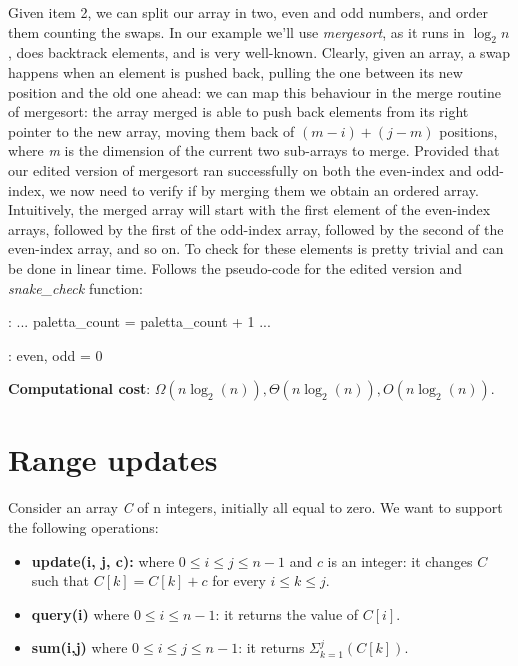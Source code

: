 \documentclass{article}
\begin{document}
Given item 2, we can split our array in two, even and odd numbers, and order
them counting the swaps.
In our example we'll use \emph{mergesort}, as it runs in $\log_2 n$, does
backtrack elements, and is very well-known.
Clearly, given an array, a swap happens when an element is pushed back, pulling
the one between its new position and the old one ahead: we can map this behaviour
in the merge routine of mergesort: the array merged is able to push back elements
from its right pointer to the new array, moving them back of $(m - i) + (j - m)$ positions,
where \emph{m} is the dimension of the current two sub-arrays to merge.
Provided that our edited version of mergesort ran successfully on both the
even-index and odd-index, we now need to verify if by merging them we obtain an
ordered array.
Intuitively, the merged array will start with the first element of the even-index
arrays, followed by the first of the odd-index array, followed by the second of
the even-index array, and so on.
To check for these elements is pretty trivial and can be done in linear time.
Follows the pseudo-code for the edited version and \emph{snake\_check} function:

\begin{algorithmic}[1]
  :
    \State ...\;                        
    \State {}
      \State paletta\_count = paletta\_count + 1\;
      \State ...\;
      \EndIf
    \EndFunction
\end{algorithmic}

\begin{algorithmic}[1]
  :
    \State even, odd = 0\;
      \State {}
        \State {}\;
        \EndIf
    \EndFor

    \;
    \EndFunction
\end{algorithmic}

\begin{framed}
  \noindent
  \textbf{Computational cost}: $\Omega(n\log_2(n)), \Theta(n\log_2(n)), O(n\log_2(n))$.
\end{framed}


\newpage
\section{Range updates}

Consider an array \emph{C} of n integers, initially all equal to zero.
We want to support the following operations:
\begin{itemize}
    \item \textbf{update(i, j, c):} where $0 \leq i \leq j \leq n - 1$ and $c$ is
    an integer: it changes $C$ such that $C[k] = C[k] + c$ for every $i \leq k \leq j$.
    \item \textbf{query(i)} where $0 \leq i \leq n - 1$: it returns the value of $C[i]$.
    \item \textbf{sum(i,j)} where $0 \leq i \leq j \leq n - 1$: it returns
                    $\Sigma_{k = 1}^{j}(C[k])$.
\end{itemize}
\end{document}

